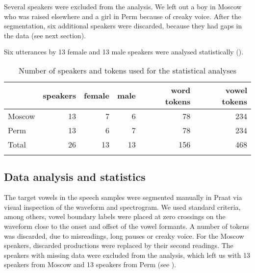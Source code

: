 \documentclass[output=paper,colorlinks,citecolor=black]{langscibook}
\begin{document}
Several speakers were excluded from the analysis. We left out a boy in Moscow who was raised elsewhere and a girl in Perm because of creaky voice. After the segmentation, six additional speakers were discarded, because they had gaps in the data (see next section).

Six utterances by 13 female and 13 male speakers were analysed statistically ().

\begin{table}
\caption{Number of speakers and tokens used for the statistical analyses}
\label{post:tab:speakers-tokens}
 \begin{tabularx}{\textwidth}{Xrrrrr}
  \lsptoprule
            & speakers & female  & male & word tokens & vowel tokens\\
  \midrule
  Moscow  &   13  &    7  &    6      & 78  &234\\
  Perm & 13 & 6 & 7 &78 & 234\\
Total & 26 & 13 & 13 & 156 & 468\\
  \lspbottomrule
 \end{tabularx}
\end{table}



\subsection{Data analysis and statistics}

The target vowels in the speech samples were segmented manually in Praat \citep{BoersmaWeenink1992} via visual inspection of the waveform and spectrogram. We used standard criteria, among others, vowel boundary labels were placed at zero crossings on the waveform close to the onset and offset of the vowel formants. A number of tokens was discarded, due to misreadings, long pauses or creaky voice. For the Moscow speakers, discarded productions were replaced by their second readings. The speakers with missing data were excluded from the analysis, which left us with 13 speakers from Moscow and 13 speakers from Perm (see ).
\end{document}
